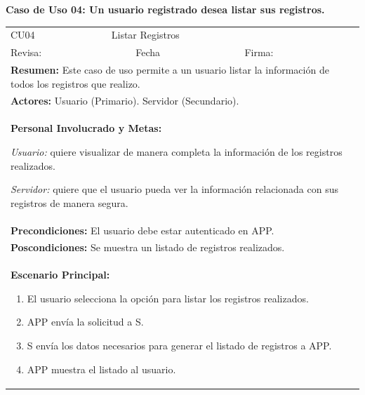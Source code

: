 		\textbf{Caso de Uso 04: Un usuario registrado desea listar sus registros.}
			\begin{longtable}{|l|p{5.5cm}|l|p{2cm}|l|p{1.9cm}|} \hline
				\cellcolor{grisOscuro} CU04 & \multicolumn{4}{|l|}{  \cellcolor{grisOscuro} Listar Registros} &  \cellcolor{grisClaro}\multirow{2}{1cm}{} \\ \cline{1-5}
				\cellcolor{grisOscuro} Revisa: &  \cellcolor{grisClaro} &  \cellcolor{grisOscuro} Fecha &  \cellcolor{grisClaro} &  \cellcolor{grisOscuro} Firma: & \cellcolor{grisClaro} \\ \hline
				\multicolumn{6}{|p{15cm}|}{ \textbf{Resumen: } Este caso de uso permite a un usuario listar la información de todos los registros que realizo.

				} \\ \hline

				\multicolumn{6}{|p{15cm}|}{ \textbf{Actores: } Usuario (Primario). Servidor (Secundario).

				} \\ \hline

				\multicolumn{6}{|p{15cm}|}{ \textbf{Personal Involucrado y Metas: }

				\emph{Usuario:} quiere visualizar de manera completa la información de los registros realizados.

				\emph{Servidor:} quiere que el usuario pueda ver la información relacionada con sus registros de manera segura.

				} \\ \hline

				\multicolumn{6}{|p{15cm}|}{ \textbf{Precondiciones: } El usuario debe estar autenticado en APP.

				} \\ \hline

				\multicolumn{6}{|p{15cm}|}{ \textbf{Poscondiciones: } Se muestra un listado de registros realizados.

				} \\ \hline

				\multicolumn{6}{|p{15cm}|}{ \textbf{Escenario Principal: }

				\begin{enumerate}
					\item El usuario selecciona la opción para listar los registros realizados.
					\item APP envía la solicitud a S.
					\item S envía los datos necesarios para generar el listado de registros a APP.
					\item APP muestra el listado al usuario.
				\end{enumerate}

}
\end{longtable}

